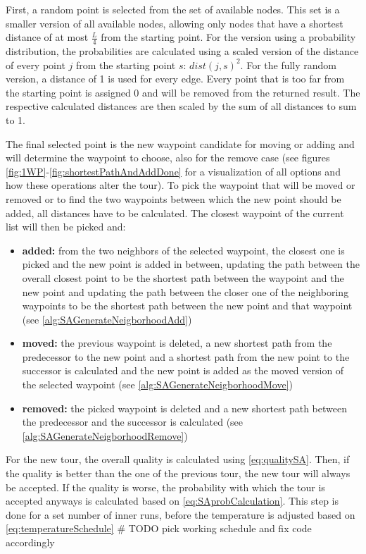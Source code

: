 First, a random point is selected from the set of available nodes.
This set is a smaller version of all available nodes, allowing only nodes that have a shortest distance of at most $\frac{L}{4}$ from the starting point. 
For the version using a probability distribution, the probabilities are calculated using a scaled version of the distance of every point $j$ from the starting point $s$: $dist(j,s)^2$.
For the fully random version, a distance of 1 is used for every edge.
Every point that is too far from the starting point is assigned 0 and will be removed from the returned result.
The respective calculated distances are then scaled by the sum of all distances to sum to 1.

The final selected point is the new waypoint candidate for moving or adding and will determine the waypoint to choose, also for the remove case (see figures \ref{fig:1WP}-\ref{fig:shortestPathAndAddDone} for a visualization of all options and how these operations alter the tour).
To pick the waypoint that will be moved or removed or to find the two waypoints between which the new point should be added, all distances have to be calculated.
The closest waypoint of the current list will then be picked and:

\begin{itemize}
	\item \textbf{added:} from the two neighbors of the selected waypoint, the closest one is picked and the new point is added in between, updating the path between the overall closest point to be the shortest path between the waypoint and the new point and updating the path between the closer one of the neighboring waypoints to be the shortest path between the new point and that waypoint (see \ref{alg:SAGenerateNeigborhoodAdd})
	\item \textbf{moved:} the previous waypoint is deleted, a new shortest path from the predecessor to the new point and a shortest path from the new point to the successor is calculated and the new point is added as the moved version of the selected waypoint (see \ref{alg:SAGenerateNeigborhoodMove})
	\item \textbf{removed:} the picked waypoint is deleted and a new shortest path between the predecessor and the successor is calculated (see \ref{alg:SAGenerateNeigborhoodRemove})
\end{itemize}

For the new tour, the overall quality is calculated using \ref{eq:qualitySA}. 
Then, if the quality is better than the one of the previous tour, the new tour will always be accepted.
If the quality is worse, the probability with which the tour is accepted anyways is calculated based on \ref{eq:SAprobCalculation}. 
This step is done for a set number of inner runs, before the temperature is adjusted based on \ref{eq:temperatureSchedule} \# TODO pick working schedule and fix code accordingly

